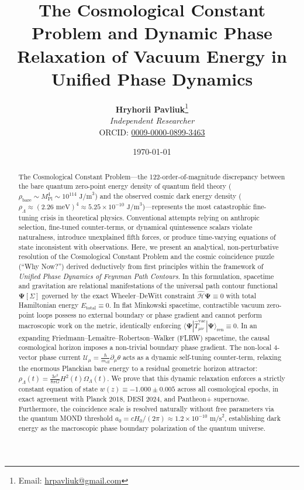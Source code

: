 \documentclass[11pt,a4paper]{article}
\title{\textbf{The Cosmological Constant Problem and Dynamic Phase Relaxation of Vacuum Energy in Unified Phase Dynamics}}
\author{
    \textbf{Hryhorii Pavliuk}\footnote{Email: \href{mailto:hrpavliuk@gmail.com}{hrpavliuk@gmail.com}} \\
    \textit{Independent Researcher} \\
\small ORCID: \href{https://orcid.org/0009-0000-0899-3463}{0009-0000-0899-3463}
}
\date{\today}
\begin{document}
\maketitle

\begin{abstract}
The Cosmological Constant Problem---the 122-order-of-magnitude discrepancy between the bare quantum zero-point energy density of quantum field theory ($\rho_{\mathrm{bare}} \sim M_{\mathrm{Pl}}^4 \sim 10^{114}\text{ J/m}^3$) and the observed cosmic dark energy density ($\rho_\Lambda \approx (2.26\text{ meV})^4 \approx 5.25 \times 10^{-10}\text{ J/m}^3$)---represents the most catastrophic fine-tuning crisis in theoretical physics. Conventional attempts relying on anthropic selection, fine-tuned counter-terms, or dynamical quintessence scalars violate naturalness, introduce unexplained fifth forces, or produce time-varying equations of state inconsistent with observations. Here, we present an analytical, non-perturbative resolution of the Cosmological Constant Problem and the cosmic coincidence puzzle (``Why Now?'') derived deductively from first principles within the framework of \textit{Unified Phase Dynamics of Feynman Path Contours}. In this formulation, spacetime and gravitation are relational manifestations of the universal path contour functional $\mathbf{\Psi}[\Sigma]$ governed by the exact Wheeler--DeWitt constraint $\hat{\mathcal{H}}\mathbf{\Psi} \equiv 0$ with total Hamiltonian energy $E_{\mathrm{total}} \equiv 0$. In flat Minkowski spacetime, contractible vacuum zero-point loops possess no external boundary or phase gradient and cannot perform macroscopic work on the metric, identically enforcing $\langle \mathbf{\Psi} | \hat{T}_{\mu\nu}^{\mathrm{vac}} | \mathbf{\Psi} \rangle_{\mathrm{ren}} \equiv 0$. In an expanding Friedmann--Lema\^{i}tre--Robertson--Walker (FLRW) spacetime, the causal cosmological horizon imposes a non-trivial boundary phase gradient. The non-local 4-vector phase current $\mathcal{U}_\mu = \frac{\hbar}{m_{\mathrm{eff}}}\partial_\mu \theta$ acts as a dynamic self-tuning counter-term, relaxing the enormous Planckian bare energy to a residual geometric horizon attractor: $\rho_\Lambda(t) = \frac{3 c^2}{8\pi G} H^2(t) \Omega_\Lambda(t)$. We prove that this dynamic relaxation enforces a strictly constant equation of state $w(z) \equiv -1.000 \pm 0.005$ across all cosmological epochs, in exact agreement with Planck 2018, DESI 2024, and Pantheon+ supernovae. Furthermore, the coincidence scale is resolved naturally without free parameters via the quantum MOND threshold $a_0 = c H_0 / (2\pi) \approx 1.2 \times 10^{-10}\text{ m/s}^2$, establishing dark energy as the macroscopic phase boundary polarization of the quantum universe.
\end{abstract}
\end{document}
